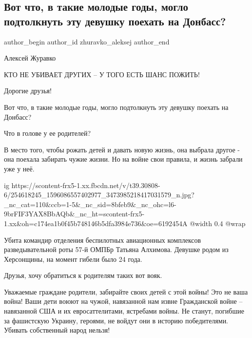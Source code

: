  
 
 
 
 
 
\subsection{Вот что, в такие молодые годы, могло подтолкнуть эту девушку поехать на Донбасс?}
\label{sec:10_11_2021.fb.zhuravko_aleksej.1.devushka_vojna_donbass}
 
\ifcmt
 author_begin
   author_id zhuravko_aleksej
 author_end
\fi

Алексей Журавко 

КТО НЕ УБИВАЕТ ДРУГИХ – У ТОГО ЕСТЬ ШАНС ПОЖИТЬ!

Дорогие друзья! 

Вот что, в такие молодые годы, могло подтолкнуть эту девушку поехать на
Донбасс? 

Что в голове у ее родителей?

В место того, чтобы рожать детей и давать новую жизнь, она выбрала другое - она
поехала забирать чужие жизни.  Но на войне свои правила, и жизнь забрали уже у
неё. 

\ifcmt
  ig https://scontent-frx5-1.xx.fbcdn.net/v/t39.30808-6/254618245_1596086557402977_3473985218417031579_n.jpg?_nc_cat=110&ccb=1-5&_nc_sid=8bfeb9&_nc_ohc=l6-9brFIF3YAX8BbAQb&_nc_ht=scontent-frx5-1.xx&oh=c174ea1b0f45b748146b5dfa3984e736&oe=6192454A
  @width 0.4
  @wrap 
\fi

Убита командир отделения беспилотных авиационных комплексов разведывательной
роты 57-й ОМПБр Татьяна Алхимова. Девушке родом из Херсонщины, на момент гибели
было 24 года.

Друзья, хочу обратиться к родителям таких вот вояк. 

Уважаемые граждане родители, забирайте своих детей с этой войны! Это не ваша
война! Ваши дети воюют на чужой, навязанной нам извне  Гражданской войне –
навязанной США и их евросаттелитами, ястребами войны. Не станут, погибшие за
фашистскую Украину,  героями, не войдут они в историю победителями. Убивать
собственный народ нельзя!


